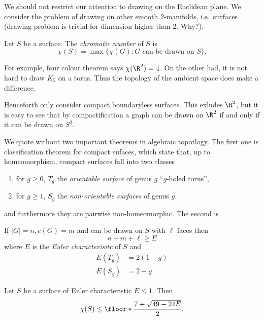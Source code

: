 \documentclass[a4paper]{article}
\begin{document}
We should not restrict our attention to drawing on the Euclidean plane. We consider the problem of drawing on other smooth \(2\)-manifolds, i.e.\ surfaces (drawing problem is trivial for dimension higher than \(2\). Why?).

\begin{definition}
  Let \(S\) be a surface. The \emph{chromatic number} of \(S\) is
  \[
    \chi(S) = \max \{\chi(G): G \text{ can be drawn on } S\}.
  \]
\end{definition}

For example, four colour theorem says \(\chi(\R^2) = 4\). On the other had, it is not hard to draw \(K_5\) on a torus. Thus the topology of the ambient space does make a difference.

Henceforth only consider compact boundaryless surfaces. This exludes \(\R^2\), but it is easy to see that by compactification a graph can be drawn on \(\R^2\) if and only if it can be drawn on \(S^2\).

We quote without two important theorems in algebraic topotlogy. The first one is classification theorem for compact sufaces, which state that, up to homeomorphism, compact surfaces fall into two classes
\begin{enumerate}
\item for \(g \geq 0\), \(T_g\) the \emph{orientable surface} of genus \(g\) ``\(g\)-holed torus'',
\item for \(g \geq 1\), \(S_g\) the \emph{non-orientable surfaces} of genus \(g\).
\end{enumerate}
and furthermore they are pairwise non-homeomorphic. The second is

\begin{proposition}
  If \(|G| = n, e(G) = m\) and can be drawn on \(S\) with \(\ell\) faces then
  \[
    n - m + \ell \geq E
  \]
  where \(E\) is the \emph{Euler characterisitc} of \(S\) and
  \begin{align*}
    E(T_g) &= 2(1 - g) \\
    E(S_g) &= 2 - g
  \end{align*}
\end{proposition}

\begin{theorem}
  Let \(S\) be a surface of Euler characteristic \(E \leq 1\). Then
  \[
    \chi(S) \leq \floor*{\frac{7 + \sqrt{49 - 24E}}{2}}.
  \]
\end{theorem}
\end{document}
